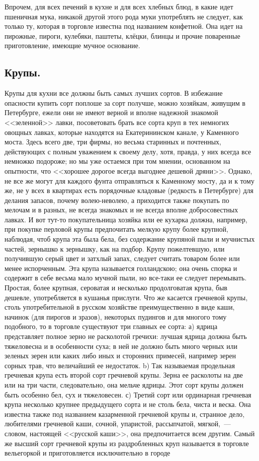 Впрочем, для всех печений в кухне и для всех хлебных блюд, в какие идет пшеничная мука, никакой другой этого рода муки употреблять не следует, как только ту, которая в торговле известна под названием конфетной. Она идет на пирожные, пироги, кулебяки, паштеты, клёцки, блинцы и прочие поваренные приготовление, имеющие мучное основание.

\subsection{Крупы.}
Крупы для кухни все должны быть самых лучших сортов. В избежание опасности купить сорт поплоше за сорт получше, можно хозяйкам, живущим в Петербурге, ежели они не имеют верной и вполне надежной знакомой <<зеленной>> лавки, посоветовать брать все сорта круп в тех немногих овощных лавках, которые находятся на Екатерининском канале, у Каменного моста. Здесь всего две, три фирмы, но весьма старинных и почтенных, действующих с полным уважением к своему делу, хотя, правда, у них всегда все немножко подороже; но мы уже остаемся при том мнении, основанном на опытности, что <<хорошее дорогое всегда выгоднее дешевой дряни>>. Однако, не все же могут для каждого фунта отправляться к Каменному мосту, да и к тому же, не у всех в квартирах есть порядочные кладовые (редкость в Петербурге) для делания запасов, почему волею-неволею, а приходится также покупать по мелочам и в разных, не всегда знакомых и не всегда вполне добросовестных лавках. И вот тут-то покупательница хозяйка или ее кухарка должна, например, при покупке перловой крупы предпочитать мелкую крупу более крупной, наблюдая, чтоб крупа эта была бела, без содержание крупяной пыли и мучнистых частей, зернышко к зернышку, как на подбор. Крупу пожелтевшую, или получившую серый цвет и затхлый запах, следует считать товаром более или менее испорченным. Эта крупа называется голландскою; она очень спорка и содержит в себе весьма мало мучной пыли, но все-таки ее следует перемывать. Простая, более крупная, сероватая и несколько продолговатая крупа, быв дешевле, употребляется в кушанья прислуги. Что же касается гречневой крупы, столь употребительной в русском хозяйстве преимущественно в виде каши, начинок (для пирогов и зразов), некоторых пудингов и для многого тому подобного, то в торговле существуют три главных ее сорта: а) ядрица представляет полное зерно не расколотой гречихи: лучшая ядрица должна быть тяжеловесна и в особенности суха; в ней не должно быть много черных или зеленых зерен или каких либо иных и сторонних примесей, например зерен сорных трав, что величайший ее недостаток. b) Так называемая продельная гречневая крупа есть второй сорт гречневой крупы. Зерна ее расколоты на две или на три части, следовательно, она мельче ядрицы. Этот сорт крупы должен быть особенно бел, сух и тяжеловесен. с) Третий сорт или ординарная гречневая крупа несколько крупнее предыдущего сорта и не столь бела, чиста и веска. Она известна также под названием казарменной гречневой крупы и, странное дело, любителями гречневой каши, сочной, упаристой, рассыпчатой, мягкой,~--- словом, настоящей <<русской каши>>, она предпочитается всем другим. Самый же высший сорт гречневой крупы из раздробленных круп называется в торговле вельегоркой и приготовляется исключительно в городе 